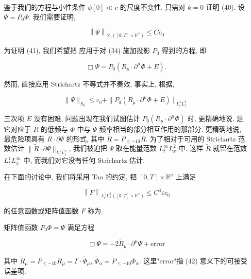 \begin{remark}\label{rem:cG-2.23}
鉴于我们的方程与小性条件 $\phi[0] \ll c$ 的尺度不变性, 只需对 $k = 0$ 证明 (40). 设 $\Psi = P_0\Phi$. 我们需要证明, 

\begin{equation}
\left\| \Psi \right\| _ {S _ {0} ([ 0,  T ] \times \mathbb {R} ^ {n})} \leq C c _ {0}\label{eq:cG-41}
\end{equation}
\end{remark}

\begin{remark}\label{rem:cG-2.24}
为证明 (41), 我们希望把 应用于对 (34) 施加投影 $P_0$ 得到的方程, 即

\[
\Box \Psi = P _ {0} (R _ {\mu} \cdot \partial^ {\mu} \Phi + E).
\]

然而, 直接应用 Strichartz 不等式并不奏效. 事实上, 根据, 

\[
\| \Psi \| _ {S _ {0}} \leq c _ {0} + \| P _ {0} (R _ {\mu} \cdot \partial^ {\mu} \Phi + E) \| _ {L _ {t} ^ {1} L _ {x} ^ {2}}
\]

三次项 $E$ 没有困难, 问题出现在我们试图估计 $P_0(R_\mu \cdot \partial^\mu \Phi)$ 时, 更精确地说, 是它对应于 $R$ 的低频与 $\Phi$ 中与 $\Psi$ 频率相当的部分相互作用的那部分. 更精确地说, 最危险项具有 $\tilde{R} \cdot \partial \Psi$ 的形式, 其中 $\tilde{R} = P_{\leq -10}R$. 为了相对于可用的 Strichartz 范数估计 $\| \tilde{R} \cdot \partial \Psi \|_{L_t^1 L_x^2}$, 我们被迫把 $\Psi$ 取在能量范数 $L_t^\infty L_x^2$ 中. 这样 $\tilde{R}$ 就留在范数 $L_t^1 L_x^\infty$ 中, 而我们对它没有任何 Strichartz 估计. 
\end{remark}

\begin{definition}\label{def:cG-2.25}
在下面的讨论中, 我们将采用 Tao 的约定, 把 $[0, T] \times \mathbb{R}^n$ 上满足

\begin{equation}
\left\| F \right\| _ {L _ {t} ^ {1} L _ {x} ^ {2} ([ 0,  T ] \times \mathbb {R} ^ {n})} \leq C ^ {3} \varepsilon c _ {0}\label{eq:cG-42}
\end{equation}

的任意函数或矩阵值函数 $F$ 称为. 
\end{definition}

\begin{proposition}\label{prop:cG-2.26}
矩阵值函数 $P_0\Phi = \Psi$ 满足方程

\begin{equation}
\Box \Psi = - 2 \tilde {R} _ {\mu} \cdot \partial^ {\mu} \Psi + \mathrm{error}\label{eq:cG-43}
\end{equation}

其中 $\tilde{R}_{\mu} = P_{\leq -10}R_{\mu} = \Gamma \cdot \tilde{\Phi}_{\mu}$, $\tilde{\Phi}_{\alpha} = P_{\leq -10}\Phi_{\alpha}$. 这里"error"指 (42) 意义下的可接受误差项. 
\end{proposition}

